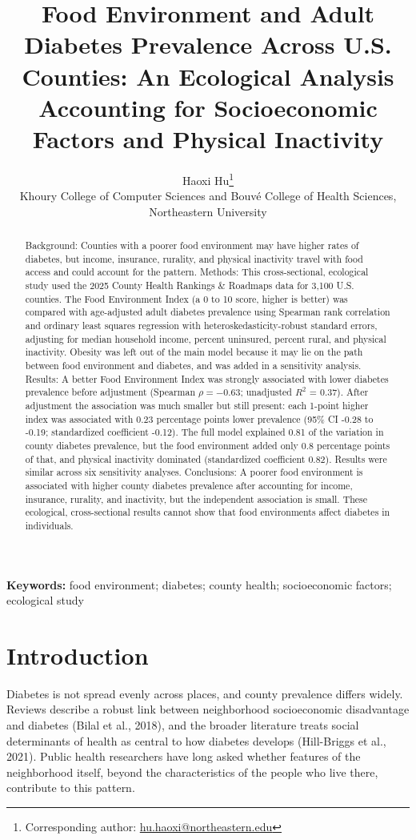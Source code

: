 \documentclass[12pt]{article}
\title{Food Environment and Adult Diabetes Prevalence Across U.S. Counties: An Ecological Analysis Accounting for Socioeconomic Factors and Physical Inactivity}
\author{Haoxi Hu\thanks{Corresponding author: \href{mailto:hu.haoxi@northeastern.edu}{hu.haoxi@northeastern.edu}}\\[2pt]
\small Khoury College of Computer Sciences and Bouv\'e College of Health Sciences,\\
\small Northeastern University}
\date{}
\begin{document}
\maketitle
\vspace{-2em}
\begin{abstract}
Background: Counties with a poorer food environment may have higher rates of diabetes, but income, insurance, rurality, and physical inactivity travel with food access and could account for the pattern. Methods: This cross-sectional, ecological study used the 2025 County Health Rankings \& Roadmaps data for 3,100 U.S. counties. The Food Environment Index (a 0 to 10 score, higher is better) was compared with age-adjusted adult diabetes prevalence using Spearman rank correlation and ordinary least squares regression with heteroskedasticity-robust standard errors, adjusting for median household income, percent uninsured, percent rural, and physical inactivity. Obesity was left out of the main model because it may lie on the path between food environment and diabetes, and was added in a sensitivity analysis. Results: A better Food Environment Index was strongly associated with lower diabetes prevalence before adjustment (Spearman $\rho = -0.63$; unadjusted $R^2$ = 0.37). After adjustment the association was much smaller but still present: each 1-point higher index was associated with 0.23 percentage points lower prevalence (95\% CI -0.28 to -0.19; standardized coefficient -0.12). The full model explained 0.81 of the variation in county diabetes prevalence, but the food environment added only 0.8 percentage points of that, and physical inactivity dominated (standardized coefficient 0.82). Results were similar across six sensitivity analyses. Conclusions: A poorer food environment is associated with higher county diabetes prevalence after accounting for income, insurance, rurality, and inactivity, but the independent association is small. These ecological, cross-sectional results cannot show that food environments affect diabetes in individuals.
\end{abstract}
\noindent\textbf{Keywords:} food environment; diabetes; county health; socioeconomic factors; ecological study

\section*{Introduction}
Diabetes is not spread evenly across places, and county prevalence differs widely. Reviews describe a robust link between neighborhood socioeconomic disadvantage and diabetes (Bilal et al., 2018), and the broader literature treats social determinants of health as central to how diabetes develops (Hill-Briggs et al., 2021). Public health researchers have long asked whether features of the neighborhood itself, beyond the characteristics of the people who live there, contribute to this pattern.
\end{document}
